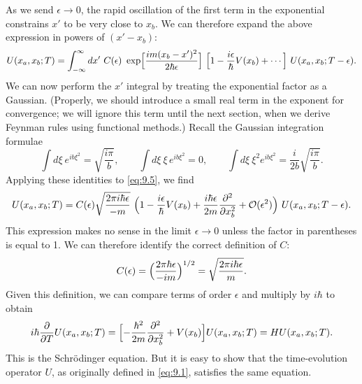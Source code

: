 As we send $\epsilon\to 0$, the rapid oscillation of the first term in the
exponential constrains $x'$ to be very close to $x_b$.  We can therefore
expand the above expression in powers of $(x'-x_b)$:
\begin{equation}
  U(x_a, x_b; T) = \int_{-\infty}^{\infty} dx'\ C(\epsilon)\
    \exp\Bigl[ \frac{im(x_b-x')^2}{2\hbar\epsilon} \Bigr]\
    \Bigl[ 1 - \frac{i\epsilon}{\hbar}V(x_b) + \cdots \Bigr]\
    U(x_a, x_b; T-\epsilon) .
  \label{eq:9.5}
\end{equation}
We can now perform the $x'$ integral by treating the exponential factor as a
Gaussian.  (Properly, we should introduce a small real term in the exponent
for convergence; we will ignore this term until the next section, when we
derive Feynman rules using functional methods.)  Recall the Gaussian
integration formulae
\begin{equation}
  \int d\xi\ e^{i b\xi^2} = \sqrt{\frac{i\pi}{b}},\qquad
  \int d\xi\ \xi\,e^{i b\xi^2} = 0,\qquad
  \int d\xi\ \xi^2 e^{i b\xi^2} = \frac{i}{2b}\sqrt{\frac{i\pi}{b}} .
\end{equation}
Applying these identities to \eqref{eq:9.5}, we find
\begin{equation}
  U(x_a, x_b; T) = C(\epsilon)\sqrt{\frac{2\pi i\hbar\epsilon}{-m}}\
    \Bigl( 1 - \frac{i\epsilon}{\hbar}V(x_b) + \frac{i\hbar\epsilon}{2m}
      \frac{\partial^2}{\partial x_b^2} + \mathcal{O}(\epsilon^2) \Bigr)\
    U(x_a, x_b; T-\epsilon) .
\end{equation}
This expression makes no sense in the limit $\epsilon\to 0$ unless the factor
in parentheses is equal to 1.  We can therefore identify the correct definition
of $C$:
\begin{equation}
  C(\epsilon) = \Bigl( \frac{2\pi\hbar\epsilon}{-im} \Bigr)^{1/2}
  = \sqrt{\frac{2\pi i\hbar\epsilon}{m}} .
  \label{eq:9.6}
\end{equation}
Given this definition, we can compare terms of order $\epsilon$ and multiply
by $i\hbar$ to obtain
\begin{equation}
  i\hbar\frac{\partial}{\partial T}U(x_a, x_b; T)
  = \Bigl[ -\frac{\hbar^2}{2m}\frac{\partial^2}{\partial x_b^2}
    + V(x_b) \Bigr]U(x_a, x_b; T)
  = H U(x_a, x_b; T) .
  \label{eq:9.7}
\end{equation}
This is the Schr\"odinger equation.  But it is easy to show that the
time-evolution operator $U$, as originally defined in \eqref{eq:9.1},
satisfies the same equation.

